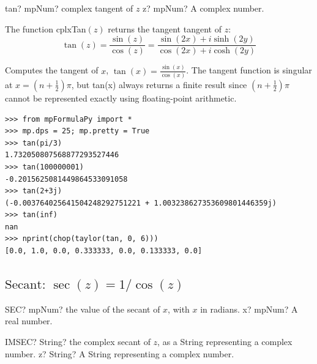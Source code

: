 \begin{mpFunctionsExtract}
	\mpFunctionOne
	{tan? mpNum? complex tangent of $z$}
	{z? mpNum? A complex number.}
\end{mpFunctionsExtract}

\vspace{0.3cm}
The function \textsf{cplxTan$(z)$} returns the tangent tangent of $z$: 
\begin{equation}
	\tan(z) =\frac{\sin(z)}{\cos(z)} = \frac{\sin(2x)+i \sinh(2y)}{\cos(2x)+i \cosh(2y)}
\end{equation}


Computes the tangent of $x$, $\tan(x)=\frac{\sin(x)}{\cos(x)}$. The tangent function is singular at $x=(n+\tfrac{1}{2})\pi$, but tan(x) always returns a finite result since $(n+\tfrac{1}{2})\pi$ cannot be represented exactly using floating-point arithmetic.

\begin{lstlisting}
>>> from mpFormulaPy import *
>>> mp.dps = 25; mp.pretty = True
>>> tan(pi/3)
1.732050807568877293527446
>>> tan(100000001)
-0.2015625081449864533091058
>>> tan(2+3j)
(-0.003764025641504248292751221 + 1.003238627353609801446359j)
>>> tan(inf)
nan
>>> nprint(chop(taylor(tan, 0, 6)))
[0.0, 1.0, 0.0, 0.333333, 0.0, 0.133333, 0.0]
\end{lstlisting}




\newpage
\subsection{\texorpdfstring{$\text{Secant: }\sec(z) = 1/\cos(z)$}{sec}}

\begin{mpFunctionsExtract}
	\mpWorksheetFunctionOneNotImplemented
	{SEC? mpNum? the value of the secant of $x$, with $x$ in radians.}
	{x? mpNum? A real number.}
\end{mpFunctionsExtract}

\vspace{0.6cm}
\begin{mpFunctionsExtract}
	\mpWorksheetFunctionOneNotImplemented
	{IMSEC? String? the complex secant of $z$, as a String representing a complex number.}
	{z? String? A String representing a complex number.}
\end{mpFunctionsExtract}




